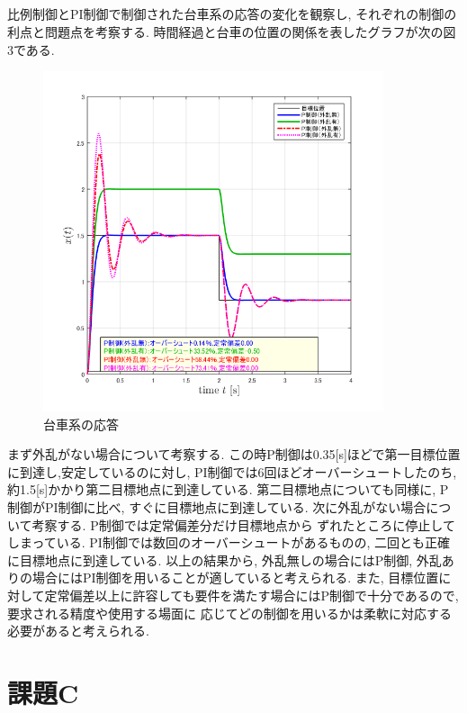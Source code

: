 \documentclass[a4paper,11pt]{jsarticle}
\begin{document}
\subsection{}
比例制御とPI制御で制御された台車系の応答の変化を観察し, それぞれの制御の利点と問題点を考察する.
時間経過と台車の位置の関係を表したグラフが次の図3である.
\begin{figure}[H]
	\begin{center}
		\includegraphics[width=10cm]{PとPI比較1.bmp}
		\caption{台車系の応答}
		\label{台車系の応答}
	\end{center}
\end{figure}
まず外乱がない場合について考察する. この時P制御は0.35[s]ほどで第一目標位置に到達し,安定しているのに対し,
PI制御では6回ほどオーバーシュートしたのち, 約1.5[s]かかり第二目標地点に到達している. 第二目標地点についても同様に,
P制御がPI制御に比べ, すぐに目標地点に到達している. 次に外乱がない場合について考察する. P制御では定常偏差分だけ目標地点から
ずれたところに停止してしまっている. PI制御では数回のオーバーシュートがあるものの, 二回とも正確に目標地点に到達している.
以上の結果から, 外乱無しの場合にはP制御, 外乱ありの場合にはPI制御を用いることが適していると考えられる.
また, 目標位置に対して定常偏差以上に許容しても要件を満たす場合にはP制御で十分であるので, 要求される精度や使用する場面に
応じてどの制御を用いるかは柔軟に対応する必要があると考えられる.
\section{課題C}
\end{document}
